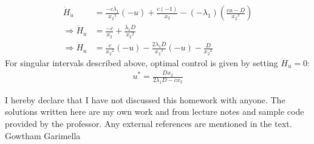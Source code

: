 \begin{enumerate}
 \begin{align*}
  \dot H_u &= \frac{-c \lambda_1}{{x_2}^2} (-u) + \frac{c(-1)}{x_2} - (-\lambda_1)\left(\frac{cu - D}{{x_2}^2}\right)\\
  \Rightarrow \dot H_u &= \frac{-c}{x_2} + \frac{\lambda_1 D}{{x_2}^2}\\
  \Rightarrow \ddot H_u &= \frac{c}{{x_2}^2} (-u) - \frac{2\lambda_1 D}{{x_2}^3}(-u) - \frac{D}{{x_2}^2}
 \end{align*}
 For singular intervals described above, optimal control is given by setting $\ddot H_u = 0$:
 \begin{align*}
  u^* = \frac{D x_2}{2 \lambda_1 D - c x_2  }
 \end{align*}






\end{enumerate} 
\vfill
\begin{acknowledgements}
I hereby declare that I have not discussed this homework with anyone. The solutions written here are
my own work and  from lecture notes and sample code provided by the professor. Any 
external references are mentioned in the text.
\flushright Gowtham Garimella
\end{acknowledgements}





